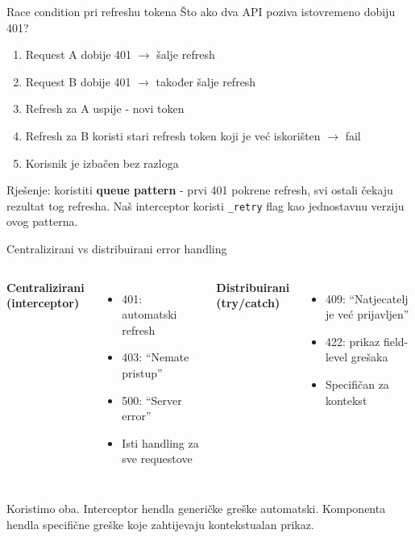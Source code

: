 \begin{frame}{Race condition pri refreshu tokena}
Što ako dva API poziva istovremeno dobiju 401?

\vspace{0.4em}
\begin{enumerate}
  \item Request A dobije 401 $\rightarrow$ šalje refresh
  \item Request B dobije 401 $\rightarrow$ također šalje refresh
  \item Refresh za A uspije - novi token
  \item Refresh za B koristi stari refresh token koji je već iskorišten $\rightarrow$ fail
  \item Korisnik je izbačen bez razloga
\end{enumerate}

\vspace{0.6em}
Rješenje: koristiti \textbf{queue pattern} - prvi 401 pokrene refresh, svi ostali čekaju rezultat tog refresha. Naš interceptor koristi \texttt{\_retry} flag kao jednostavnu verziju ovog patterna.
\end{frame}

\begin{frame}{Centralizirani vs distribuirani error handling}
\begin{columns}[T]
\textbf{Centralizirani (interceptor)}
\begin{itemize}
  \item 401: automatski refresh
  \item 403: \enquote{Nemate pristup}
  \item 500: \enquote{Server error}
  \item Isti handling za sve requestove
\end{itemize}

\textbf{Distribuirani (try/catch)}
\begin{itemize}
  \item 409: \enquote{Natjecatelj je već prijavljen}
  \item 422: prikaz field-level grešaka
  \item Specifičan za kontekst
\end{itemize}
\end{columns}

\vspace{0.6em}
Koristimo oba. Interceptor hendla generičke greške automatski. Komponenta hendla specifične greške koje zahtijevaju kontekstualan prikaz.
\end{frame}

